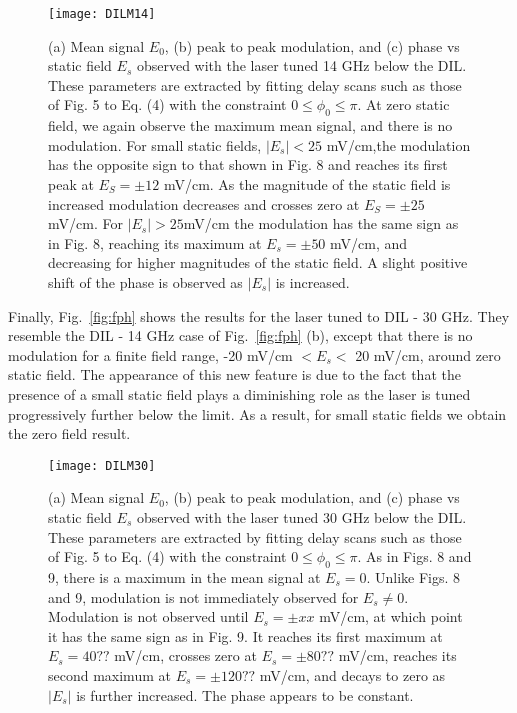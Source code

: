 \documentclass[aps,pra,preprint,groupedaddress]{revtex4-1}
\begin{document}
\begin{figure}
	\texttt{[image: DILM14]}
	\caption{(a) Mean signal $E_0$, (b) peak to peak modulation, and (c) phase vs static field $E_s$ observed with the laser tuned 14 GHz below the DIL. These parameters are extracted by fitting delay scans such as those of Fig. 5 to Eq. (4) with the constraint $0\leq\phi_0\leq\pi$. At zero static field, we again observe the maximum mean signal, and there is no modulation. For small static fields, $|E_s|<25$ mV/cm,the modulation has the opposite sign to that shown in Fig. 8 and reaches its first peak at $E_S = \pm 12$ mV/cm. As the magnitude of the static field is increased modulation decreases and crosses zero at $E_S = \pm 25$ mV/cm. For $|E_s|> 25$mV/cm the modulation has the same sign as in Fig. 8, reaching its maximum at $E_s=\pm50$ mV/cm, and decreasing for higher magnitudes of the static field. A slight positive shift of the phase is observed as $|E_s|$ is increased.}
	\label{fig:DILM14}
\end{figure}




Finally, Fig.~\ref{fig:fph} shows the results for the laser tuned to DIL - 30 GHz. They resemble the DIL - 14 GHz case of Fig.~\ref{fig:fph} (b), except that there is no modulation for a finite field range, -20 mV/cm $<E_s<$ 20 mV/cm, around zero static field. The appearance of this new feature is due to the fact that the presence of a small static field plays a diminishing role as the laser is tuned progressively further below the limit. As a result, for small static fields we obtain the zero field result.


\begin{figure}
	\texttt{[image: DILM30]}
	\caption{(a) Mean signal $E_0$, (b) peak to peak modulation, and (c) phase vs static field $E_s$ observed with the laser tuned 30 GHz below the DIL. These parameters are extracted by fitting delay scans such as those of Fig. 5 to Eq. (4) with the constraint $0\leq\phi_0\leq\pi$. As in Figs. 8 and 9, there is a maximum in the mean signal at $E_s=0$. Unlike Figs. 8 and 9, modulation is not immediately observed for $E_s\neq 0$. Modulation is not observed until $E_s=\pm xx$ mV/cm, at which point it has the same sign as in Fig. 9. It reaches its first maximum at $E_s=40??$ mV/cm, crosses zero at $E_s=\pm80??$ mV/cm, reaches its second maximum at $E_s=\pm120??$ mV/cm, and decays to zero as $|E_s|$ is further increased. The phase appears to be constant.}
	\label{fig:DILM30}
\end{figure}
\end{document}
